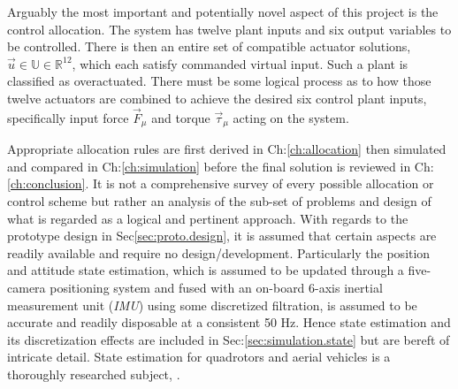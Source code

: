 \par
Arguably the most important and potentially novel aspect of this project is the control allocation. The system has twelve plant inputs and six output variables to be controlled. There is then an entire set of compatible actuator solutions, $\vec{u}\in\mathbb{U}\in\mathbb{R}^{12}$, which each satisfy commanded virtual input. Such a plant is classified as overactuated. There must be some logical process as to how those twelve actuators are combined to achieve the desired six control plant inputs, specifically input force $\vec{F}_{\mu}$ and torque $\vec{\tau}_{\mu}$ acting on the system.
\par
Appropriate allocation rules are first derived in Ch:\ref{ch:allocation} then simulated and compared in Ch:\ref{ch:simulation} before the final solution is reviewed in Ch:\ref{ch:conclusion}. It is not a comprehensive survey of every possible allocation or control scheme but rather an analysis of the sub-set of problems and design of what is regarded as a logical and pertinent approach. With regards to the prototype design in Sec\ref{sec:proto.design}, it is assumed that certain aspects are readily available and require no design/development. Particularly the position and attitude state estimation, which is assumed to be updated through a five-camera positioning system and fused with an on-board 6-axis inertial measurement unit (\emph{IMU}) using some discretized filtration, is assumed to be accurate and readily disposable at a consistent 50 Hz. Hence state estimation and its discretization effects are included in Sec:\ref{sec:simulation.state} but are bereft of intricate detail. State estimation for quadrotors and aerial vehicles is a thoroughly researched subject, \cite{arnold,spacecraftkalman,attitudedetermination}.
